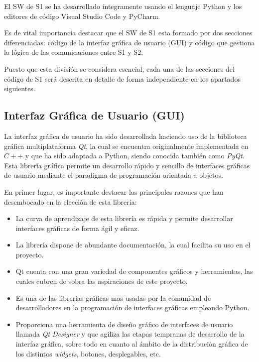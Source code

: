 El \ac{SW} de \ac{S1} se ha desarrollado íntegramente usando el lenguaje Python y los editores de código Visual Studio Code y PyCharm.

Es de vital importancia destacar que el \ac{SW} de \ac{S1} esta formado por dos secciones diferenciadas: código de la interfaz gráfica de usuario (GUI) y código que gestiona la lógica de las comunicaciones entre \ac{S1} y \ac{S2}.

Puesto que esta división se considera esencial, cada una de las secciones del código de \ac{S1} será descrita en detalle de forma independiente en los apartados siguientes.

\subsection{Interfaz Gráfica de Usuario (GUI)}

La interfaz gráfica de usuario ha sido desarrollada haciendo uso de la biblioteca gráfica multiplataforma \textit{Qt}, la cual se encuentra originalmente implementada en $C++$ y que ha sido adaptada a Python, siendo conocida también como \textit{PyQt}. Esta librería gráfica permite un desarrollo rápido y sencillo de interfaces gráficas de usuario mediante el paradigma de programación orientada a objetos.

En primer lugar, es importante destacar las principales razones que han desembocado en la elección de esta librería:
\begin{itemize}
    \item La curva de aprendizaje de esta librería es rápida y permite desarrollar interfaces gráficas de forma ágil y eficaz.
    \item La librería dispone de abundante documentación, la cual facilita su uso en el proyecto.
    \item Qt cuenta con una gran variedad de componentes gráficos y herramientas, las cuales cubren de sobra las aspiraciones de este proyecto.
    \item Es una de las librerías gráficas mas usadas por la comunidad de desarrolladores en la programación de interfaces gráficas empleando Python.
    \item Proporciona una herramienta de diseño gráfico de interfaces de usuario llamada \textit{Qt Designer} y que agiliza las etapas tempranas de desarrollo de la interfaz gráfica, sobre todo en cuanto al ámbito de la distribución gráfica de los distintos \textit{widgets}, botones, desplegables, etc.
\end{itemize}

